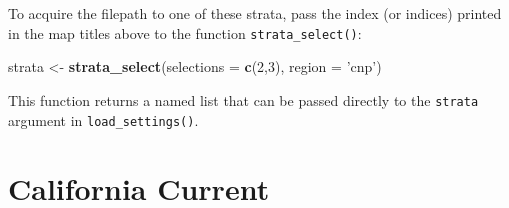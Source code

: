 \documentclass[
]{book}
\newenvironment{Shaded}{\begin{snugshade}}{\end{snugshade}}
\newcommand{\DataTypeTok}[1]{\textcolor[rgb]{0.13,0.29,0.53}{#1}}
\newcommand{\DecValTok}[1]{\textcolor[rgb]{0.00,0.00,0.81}{#1}}
\newcommand{\FloatTok}[1]{\textcolor[rgb]{0.00,0.00,0.81}{#1}}
\newcommand{\KeywordTok}[1]{\textcolor[rgb]{0.13,0.29,0.53}{\textbf{#1}}}
\newcommand{\NormalTok}[1]{#1}
\newcommand{\OperatorTok}[1]{\textcolor[rgb]{0.81,0.36,0.00}{\textbf{#1}}}
\newcommand{\StringTok}[1]{\textcolor[rgb]{0.31,0.60,0.02}{#1}}
\begin{document}
To acquire the filepath to one of these strata, pass the index (or indices) printed in the map titles above to the function \texttt{strata\_select()}:

\begin{Shaded}
\begin{Highlighting}[]
\NormalTok{strata <-}\StringTok{ }\KeywordTok{strata_select}\NormalTok{(}\DataTypeTok{selections =} \KeywordTok{c}\NormalTok{(}\DecValTok{2}\NormalTok{,}\DecValTok{3}\NormalTok{),}
                              \DataTypeTok{region =} \StringTok{'cnp'}\NormalTok{)}
\end{Highlighting}
\end{Shaded}

This function returns a named list that can be passed directly to the \texttt{strata} argument in \texttt{load\_settings()}.

\begin{Shaded}
\end{Shaded}

\hypertarget{california-current}{%
\section*{California Current}\label{california-current}}
\end{document}

